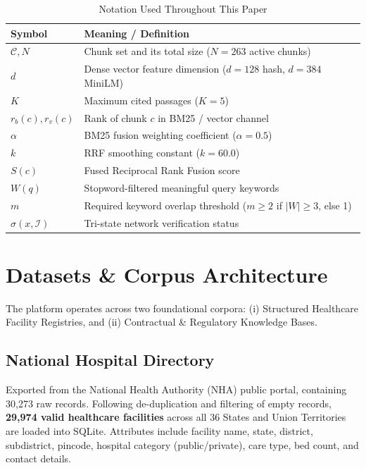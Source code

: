 \documentclass[conference]{IEEEtran}
\begin{document}
\begin{table}[htbp]
\caption{Notation Used Throughout This Paper}
\begin{center}
\begin{tabular}{ll}
\toprule
\textbf{Symbol} & \textbf{Meaning / Definition} \\
\midrule
$\mathcal{C}, N$ & Chunk set and its total size ($N = 263$ active chunks) \\
$d$ & Dense vector feature dimension ($d = 128$ hash, $d = 384$ MiniLM) \\
$K$ & Maximum cited passages ($K = 5$) \\
$r_b(c), r_v(c)$ & Rank of chunk $c$ in BM25 / vector channel \\
$\alpha$ & BM25 fusion weighting coefficient ($\alpha = 0.5$) \\
$k$ & RRF smoothing constant ($k = 60.0$) \\
$S(c)$ & Fused Reciprocal Rank Fusion score \\
$W(q)$ & Stopword-filtered meaningful query keywords \\
$m$ & Required keyword overlap threshold ($m \ge 2$ if $|W| \ge 3$, else 1) \\
$\sigma(x, \mathcal{I})$ & Tri-state network verification status \\
\bottomrule
\end{tabular}
\end{center}
\end{table}

\section{Datasets \& Corpus Architecture}
The platform operates across two foundational corpora: (i) Structured Healthcare Facility Registries, and (ii) Contractual \& Regulatory Knowledge Bases.

\subsection{National Hospital Directory}
Exported from the National Health Authority (NHA) public portal, containing 30,273 raw records. Following de-duplication and filtering of empty records, \textbf{29,974 valid healthcare facilities} across all 36 States and Union Territories are loaded into SQLite. Attributes include facility name, state, district, subdistrict, pincode, hospital category (public/private), care type, bed count, and contact details.
\end{document}
